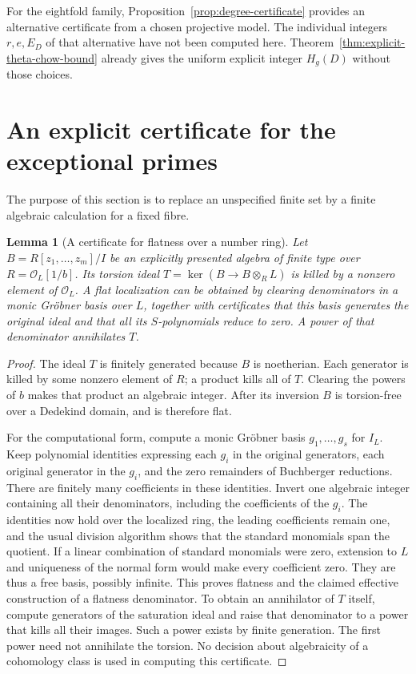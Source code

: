 \documentclass[11pt]{article}
\newtheorem{lemma}[theorem]{Lemma}
\theoremstyle{definition}
\theoremstyle{remark}
\begin{document}
For the eightfold family, Proposition~\ref{prop:degree-certificate}
provides an alternative certificate from a chosen projective model.
The individual integers $r,e,E_D$ of that alternative have not been
computed here. Theorem~\ref{thm:explicit-theta-chow-bound} already
gives the uniform explicit integer $H_g(D)$ without those choices.

\section{An explicit certificate for the exceptional primes}

The purpose of this section is to replace an unspecified finite
set by a finite algebraic calculation for a fixed fibre.

\begin{lemma}[A certificate for flatness over a number ring]
\label{lem:certificate}
Let $B=R[z_1,\ldots,z_m]/I$ be an explicitly presented algebra
of finite type over $R=\mathcal O_L[1/b]$. Its torsion ideal
$T=\ker(B\to B\otimes_RL)$ is killed by a nonzero element
of $\mathcal O_L$. A flat localization can be obtained by clearing denominators
in a monic Gr\"obner basis over $L$, together with certificates
that this basis generates the original ideal and that all its
$S$-polynomials reduce to zero. A power of that denominator
annihilates $T$.
\end{lemma}
\begin{proof}
The ideal $T$ is finitely generated because $B$ is noetherian.
Each generator is killed by some nonzero element of $R$; a
product kills all of $T$. Clearing the powers of $b$ makes that
product an algebraic integer. After its inversion $B$ is
torsion-free over a Dedekind domain, and is therefore flat.

For the computational form, compute a monic Gr\"obner basis
$g_1,\ldots,g_s$ for $I_L$. Keep polynomial identities expressing
each $g_i$ in the original generators, each original generator
in the $g_i$, and the zero remainders of Buchberger reductions.
There are finitely many coefficients in these identities. Invert
one algebraic integer containing all their denominators, including
the coefficients of the $g_i$. The identities now hold over
the localized ring, the leading coefficients remain one, and
the usual division algorithm shows that the standard monomials
span the quotient. If a linear combination of standard monomials
were zero, extension to $L$ and uniqueness of the normal form
would make every coefficient zero. They are thus a free basis,
possibly infinite. This proves flatness and the claimed effective
construction of a flatness denominator. To obtain an annihilator
of $T$ itself, compute generators of the saturation ideal and
raise that denominator to a power that kills all their images.
Such a power exists by finite generation. The first power need
not annihilate the torsion. No decision about algebraicity of a cohomology
class is used in computing this certificate.
\end{proof}
\end{document}
